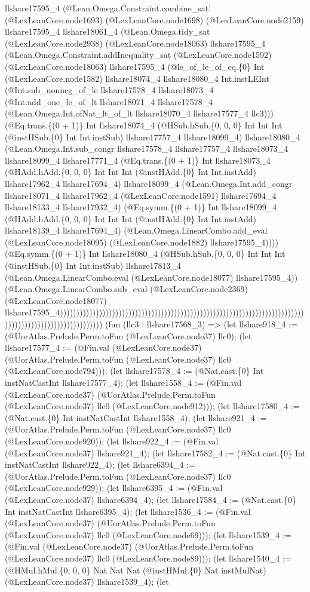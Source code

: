 \documentclass[11pt]{article}
\begin{document}
llshare17595\_4 (@Lean.Omega.Constraint.combine\_sat' (@LexLeanCore.node1693) (@LexLeanCore.node1698) (@LexLeanCore.node2159) llshare17595\_4 llshare18061\_4 (@Lean.Omega.tidy\_sat (@LexLeanCore.node2938) (@LexLeanCore.node18063) llshare17595\_4 (@Lean.Omega.Constraint.addInequality\_sat (@LexLeanCore.node1592) (@LexLeanCore.node18063) llshare17595\_4 (@le\_of\_le\_of\_eq.\{0\} Int (@LexLeanCore.node1582) llshare18074\_4 llshare18080\_4 Int.instLEInt (@Int.sub\_nonneg\_of\_le llshare17578\_4 llshare18073\_4 (@Int.add\_one\_le\_of\_lt llshare18071\_4 llshare17578\_4 (@Lean.Omega.Int.ofNat\_lt\_of\_lt llshare18070\_4 llshare17577\_4 llc3))) (@Eq.trans.\{(0 + 1)\} Int llshare18074\_4 (@HSub.hSub.\{0, 0, 0\} Int Int Int (@instHSub.\{0\} Int Int.instSub) llshare17757\_4 llshare18099\_4) llshare18080\_4 (@Lean.Omega.Int.sub\_congr llshare17578\_4 llshare17757\_4 llshare18073\_4 llshare18099\_4 llshare17771\_4 (@Eq.trans.\{(0 + 1)\} Int llshare18073\_4 (@HAdd.hAdd.\{0, 0, 0\} Int Int Int (@instHAdd.\{0\} Int Int.instAdd) llshare17962\_4 llshare17694\_4) llshare18099\_4 (@Lean.Omega.Int.add\_congr llshare18071\_4 llshare17962\_4 (@LexLeanCore.node1591) llshare17694\_4 llshare18133\_4 llshare17932\_4) (@Eq.symm.\{(0 + 1)\} Int llshare18099\_4 (@HAdd.hAdd.\{0, 0, 0\} Int Int Int (@instHAdd.\{0\} Int Int.instAdd) llshare18139\_4 llshare17694\_4) (@Lean.Omega.LinearCombo.add\_eval (@LexLeanCore.node18095) (@LexLeanCore.node1882) llshare17595\_4)))) (@Eq.symm.\{(0 + 1)\} Int llshare18080\_4 (@HSub.hSub.\{0, 0, 0\} Int Int Int (@instHSub.\{0\} Int Int.instSub) llshare17813\_4 (@Lean.Omega.LinearCombo.eval (@LexLeanCore.node18077) llshare17595\_4)) (@Lean.Omega.LinearCombo.sub\_eval (@LexLeanCore.node2369) (@LexLeanCore.node18077) llshare17595\_4))))))))))))))))))))))))))))))))))))))))))))))))))))))))))))))))))))))))))))))))))))))))))))))))))))))))) (fun (llc3 : llshare17568\_3) => (let llshare918\_4 := (@UorAtlas.Prelude.Perm.toFun (@LexLeanCore.node37) llc0); (let llshare17577\_4 := (@Fin.val (@LexLeanCore.node37) (@UorAtlas.Prelude.Perm.toFun (@LexLeanCore.node37) llc0 (@LexLeanCore.node794))); (let llshare17578\_4 := (@Nat.cast.\{0\} Int instNatCastInt llshare17577\_4); (let llshare1558\_4 := (@Fin.val (@LexLeanCore.node37) (@UorAtlas.Prelude.Perm.toFun (@LexLeanCore.node37) llc0 (@LexLeanCore.node912))); (let llshare17580\_4 := (@Nat.cast.\{0\} Int instNatCastInt llshare1558\_4); (let llshare921\_4 := (@UorAtlas.Prelude.Perm.toFun (@LexLeanCore.node37) llc0 (@LexLeanCore.node920)); (let llshare922\_4 := (@Fin.val (@LexLeanCore.node37) llshare921\_4); (let llshare17582\_4 := (@Nat.cast.\{0\} Int instNatCastInt llshare922\_4); (let llshare6394\_4 := (@UorAtlas.Prelude.Perm.toFun (@LexLeanCore.node37) llc0 (@LexLeanCore.node929)); (let llshare6395\_4 := (@Fin.val (@LexLeanCore.node37) llshare6394\_4); (let llshare17584\_4 := (@Nat.cast.\{0\} Int instNatCastInt llshare6395\_4); (let llshare1536\_4 := (@Fin.val (@LexLeanCore.node37) (@UorAtlas.Prelude.Perm.toFun (@LexLeanCore.node37) llc0 (@LexLeanCore.node69))); (let llshare1539\_4 := (@Fin.val (@LexLeanCore.node37) (@UorAtlas.Prelude.Perm.toFun (@LexLeanCore.node37) llc0 (@LexLeanCore.node89))); (let llshare1540\_4 := (@HMul.hMul.\{0, 0, 0\} Nat Nat Nat (@instHMul.\{0\} Nat instMulNat) (@LexLeanCore.node37) llshare1539\_4); (let 
\end{document}
